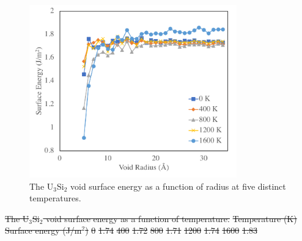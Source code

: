\documentclass[review]{elsarticle}
\providecommand{\DIFdeltex}[1]{{\protect\color{red}\sout{#1}}}                      %
\providecommand{\DIFdelbegin}{} %
\providecommand{\DIFdelFL}[1]{\DIFdel{#1}} %
\providecommand{\DIFdel}[1]{\texorpdfstring{\DIFdeltex{#1}}{}} %
\newcommand{\DIFscaledelfig}{0.5}
\newlength{\DIFdelgraphicswidth} %
\newlength{\DIFdelgraphicsheight} %
\newcommand{\DIFdelincludegraphics}[2][]{%
\sbox{\DIFdelgraphicsbox}{\DIFOincludegraphics[#1]{#2}}%
\settoboxwidth{\DIFdelgraphicswidth}{\DIFdelgraphicsbox} %
\settoboxtotalheight{\DIFdelgraphicsheight}{\DIFdelgraphicsbox} %
\scalebox{\DIFscaledelfig}{%
\parbox[b]{\DIFdelgraphicswidth}{\usebox{\DIFdelgraphicsbox}\\[-\baselineskip] \rule{\DIFdelgraphicswidth}{0em}}\llap{\resizebox{\DIFdelgraphicswidth}{\DIFdelgraphicsheight}{%
\setlength{\unitlength}{\DIFdelgraphicswidth}%
\begin{picture}(1,1)%
\thicklines\linethickness{2pt} %
{\color[rgb]{1,0,0}\put(0,0){\framebox(1,1){}}}%
{\color[rgb]{1,0,0}\put(0,0){\line( 1,1){1}}}%
{\color[rgb]{1,0,0}\put(0,1){\line(1,-1){1}}}%
\end{picture}%
}\hspace*{3pt}}} %
} %
\DeclareRobustCommand{\DIFdelbegin}{\DIFOdelbegin \let\includegraphics\DIFdelincludegraphics} %
\begin{document}
\begin{figure}[h]
 \centering
 \includegraphics[width=0.8\textwidth]{void_vs_rc.png} 
 \caption{The U$_{3}$Si$_{2}$ void surface energy as a function of radius at five distinct temperatures. }
 \label{fig:void}
\end{figure}



\DIFdelbegin %
{%
\DIFdelFL{The U$_{3}$Si$_{2}$ void surface energy as a function of temperature.}} %
\DIFdelFL{Temperature (K) }%
\DIFdelFL{Surface energy (J/m$^{2}$)}%
\DIFdelFL{0 }%
\DIFdelFL{1.74	 }%
\DIFdelFL{400 }%
\DIFdelFL{1.72 }%
\DIFdelFL{800 }%
\DIFdelFL{1.71	 }%
\DIFdelFL{1200 }%
\DIFdelFL{1.74 }%
\DIFdelFL{1600 }%
\DIFdelFL{1.83 }%
\end{document}
